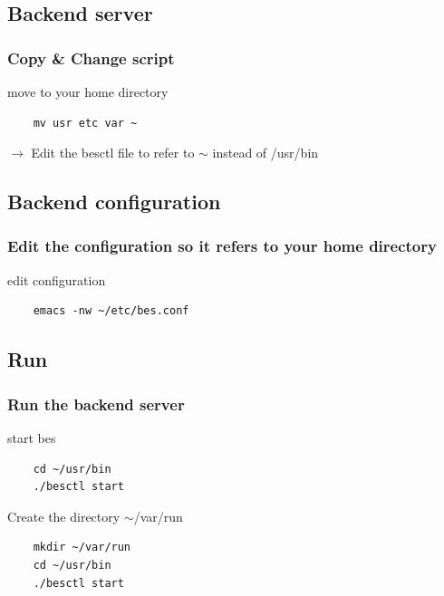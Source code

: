 \documentclass[]{beamer}
\begin{document}
\subsection{Backend server}
\begin{frame}[fragile]
  \frametitle{Copy \& Change script}
  

  \lstset{language=bash}
  \begin{block}{move to  your home directory}
  \begin{lstlisting}
    mv usr etc var ~
  \end{lstlisting}
  $\rightarrow$ Edit the besctl file to refer to $\sim$ instead of /usr/bin
  \end{block}


\end{frame}



\subsection{Backend configuration}

\begin{frame}[fragile]
  \frametitle{Edit the configuration so it refers to your home directory}
 \lstset{language=bash}
 \begin{block}{edit configuration}
  \begin{lstlisting}
    emacs -nw ~/etc/bes.conf
  \end{lstlisting}
  \end{block}

\end{frame}

\subsection{Run}
\begin{frame}[fragile]
  \frametitle{Run the backend server}
 \lstset{language=bash}
 \begin{block}{start bes}
  \begin{lstlisting}
    cd ~/usr/bin
    ./besctl start
  \end{lstlisting}
  \end{block}
  \begin{block}{Create the directory $\sim$/var/run}
  \begin{lstlisting}
    mkdir ~/var/run
    cd ~/usr/bin
    ./besctl start
  \end{lstlisting}
  \end{block}

\end{frame}
\end{document}
